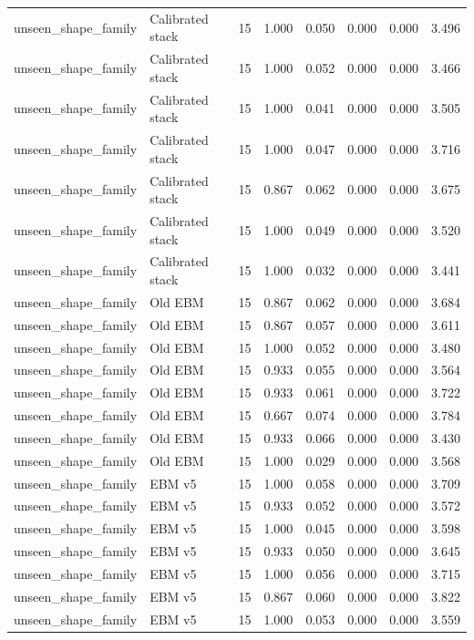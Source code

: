 {\begin{longtable}{llrrrrrr}
unseen\_shape\_family & Calibrated stack & 15 & 1.000 & 0.050 & 0.000 & 0.000 & 3.496 \\
unseen\_shape\_family & Calibrated stack & 15 & 1.000 & 0.052 & 0.000 & 0.000 & 3.466 \\
unseen\_shape\_family & Calibrated stack & 15 & 1.000 & 0.041 & 0.000 & 0.000 & 3.505 \\
unseen\_shape\_family & Calibrated stack & 15 & 1.000 & 0.047 & 0.000 & 0.000 & 3.716 \\
unseen\_shape\_family & Calibrated stack & 15 & 0.867 & 0.062 & 0.000 & 0.000 & 3.675 \\
unseen\_shape\_family & Calibrated stack & 15 & 1.000 & 0.049 & 0.000 & 0.000 & 3.520 \\
unseen\_shape\_family & Calibrated stack & 15 & 1.000 & 0.032 & 0.000 & 0.000 & 3.441 \\
unseen\_shape\_family & Old EBM & 15 & 0.867 & 0.062 & 0.000 & 0.000 & 3.684 \\
unseen\_shape\_family & Old EBM & 15 & 0.867 & 0.057 & 0.000 & 0.000 & 3.611 \\
unseen\_shape\_family & Old EBM & 15 & 1.000 & 0.052 & 0.000 & 0.000 & 3.480 \\
unseen\_shape\_family & Old EBM & 15 & 0.933 & 0.055 & 0.000 & 0.000 & 3.564 \\
unseen\_shape\_family & Old EBM & 15 & 0.933 & 0.061 & 0.000 & 0.000 & 3.722 \\
unseen\_shape\_family & Old EBM & 15 & 0.667 & 0.074 & 0.000 & 0.000 & 3.784 \\
unseen\_shape\_family & Old EBM & 15 & 0.933 & 0.066 & 0.000 & 0.000 & 3.430 \\
unseen\_shape\_family & Old EBM & 15 & 1.000 & 0.029 & 0.000 & 0.000 & 3.568 \\
unseen\_shape\_family & EBM v5 & 15 & 1.000 & 0.058 & 0.000 & 0.000 & 3.709 \\
unseen\_shape\_family & EBM v5 & 15 & 0.933 & 0.052 & 0.000 & 0.000 & 3.572 \\
unseen\_shape\_family & EBM v5 & 15 & 1.000 & 0.045 & 0.000 & 0.000 & 3.598 \\
unseen\_shape\_family & EBM v5 & 15 & 0.933 & 0.050 & 0.000 & 0.000 & 3.645 \\
unseen\_shape\_family & EBM v5 & 15 & 1.000 & 0.056 & 0.000 & 0.000 & 3.715 \\
unseen\_shape\_family & EBM v5 & 15 & 0.867 & 0.060 & 0.000 & 0.000 & 3.822 \\
unseen\_shape\_family & EBM v5 & 15 & 1.000 & 0.053 & 0.000 & 0.000 & 3.559 \\

\end{longtable}}
